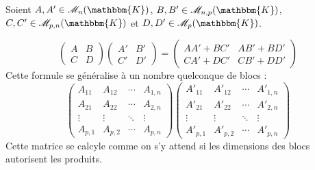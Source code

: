 \begin{prop}
	Soient $A,A' \in \mathcal{M}_n(\mathbbm{K})$, $B,B' \in \mathcal{M}_{n,p}(\mathbbm{K})$, $C,C' \in \mathcal{M}_{p,n}(\mathbbm{K})$ et $D, D' \in \mathcal{M}_p(\mathbbm{K})$.

	\[
		\left(\begin{array}{c|c}
			A&B\\ \hline
			C&D
		\end{array}\right)
		\left(\begin{array}{c|c}
			A'&B'\\ \hline
			C'&D'
		\end{array}\right) = 
		\left(\begin{array}{c|c}
			AA' + BC'& AB' + BD'\\ \hline
			CA' + DC'&CB' + DD'
		\end{array}\right)
	\] Cette formule se généralise à un nombre quelconque de blocs : \[
		\left(\begin{array}{c|c|c|c}
				A_{11}&A_{12}&\cdots&A_{1,n}\\ \hline
				A_{21}&A_{22}&\cdots&A_{2,n}\\ \hline
				\vdots&\vdots&\ddots&\vdots\\ \hline
				A_{p,1}&A_{p,2}&\cdots&A_{p,n}
		\end{array}\right)
		\left(\begin{array}{c|c|c|c}
				A'_{11}&A'_{12}&\cdots&A'_{1,n}\\ \hline
				A'_{21}&A'_{22}&\cdots&A'_{2,n}\\ \hline
				\vdots&\vdots&\ddots&\vdots\\ \hline
				A'_{p,1}&A'_{p,2}&\cdots&A'_{p,n}
		\end{array}\right)
	\] Cette matrice se calcyle comme on s'y attend si les dimensions des blocs autorisent les produits.
\end{prop}



